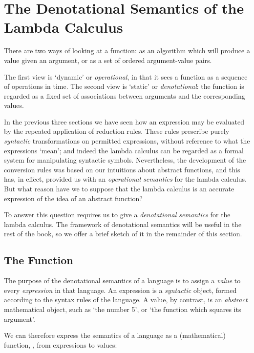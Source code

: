 \section{The Denotational Semantics of the Lambda Calculus}

There are two ways of looking at a function: as an algorithm which will
produce a value given an argument, or as a set of ordered argument-value
pairs.

The first view is `dynamic' or \textit{operational}, in that it sees a function as a
sequence of operations in time. The second view is `static' or \textit{denotational}: the
function is regarded as a fixed set of associations between arguments and the
corresponding values.

In the previous three sections we have seen how an expression may be
evaluated by the repeated application of reduction rules. These rules
prescribe purely \textit{syntactic} transformations on permitted expressions, without
reference to what the expressions `mean'; and indeed the lambda calculus can
be regarded as a formal system for manipulating syntactic symbols. Nevertheless, the development of the conversion rules was based on our intuitions about abstract functions, and this has, in effect, provided us with an
\textit{operational semantics} for the lambda calculus. But what reason have we to
suppose that the lambda calculus is an accurate expression of the idea of an
abstract function?

To answer this question requires us to give a \textit{denotational semantics} for the
lambda calculus. The framework of denotational semantics will be useful in
the rest of the book, so we offer a brief sketch of it in the remainder of this
section.

\subsection{The  Function}

The purpose of the denotational semantics of a language is to assign a \textit{value} to
every \textit{expression} in that language. An expression is a \textit{syntactic} object, formed
according to the syntax rules of the language. A value, by contrast, is an
\textit{abstract} mathematical object, such as `the number 5', or `the function which
squares its argument'.

We can therefore express the semantics of a language as a (mathematical)
function, , from expressions to values:

